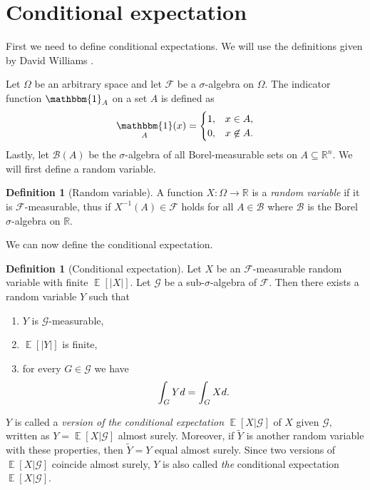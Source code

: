 \documentclass[twoside,a4paper]{report}
\theoremstyle{plain}
\theoremstyle{definition}
\newtheorem{definition}[theorem]{Definition}
\theoremstyle{remark}
\numberwithin{equation}{chapter}
\newcommand{\R}{\mathbb{R}}
\let\P\relax
\DeclareMathOperator{\P}{\mathbb{P}}
\DeclareMathOperator{\E}{\mathbb{E}}
\DeclareMathOperator{\1}{\mathbbm{1}}
\newcommand{\F}{\mathcal{F}}
\renewcommand{\G}{\mathcal{G}}
\newcommand{\B}{\mathcal{B}}
\begin{document}
\section{Conditional expectation}
First we need to define conditional expectations. We will use the definitions given by David Williams \cite{Williams91}.

Let $\Omega$ be an arbitrary space and let $\mathcal{F}$ be a $\sigma$-algebra on $\Omega$. The indicator function $\1_A$ on a set $A$ is defined as
\begin{equation}
\1_A(x)=\begin{cases}1,&x\in A,\\0,&x\not\in A.\end{cases}
\end{equation}
Lastly, let $\B(A)$ be the $\sigma$-algebra of all Borel-measurable sets on $A\subseteq\R^n$. We will first define a random variable.

\begin{definition}[Random variable]
A function $X\colon\Omega\to\R$ is a \emph{random variable} if it is $\F$-measurable, thus if $X^{-1}(A)\in\F$ holds for all $A\in\B$ where $\B$ is the Borel $\sigma$-algebra on $\R$.
\end{definition}

We can now define the conditional expectation.

\begin{definition}[Conditional expectation]\label{def:conexp}
Let $X$ be an $\F$-measurable random variable with finite $\E[|X|]$. Let $\G$ be a sub-$\sigma$-algebra of $\F$. Then there exists a random variable $Y$ such that 
\begin{enumerate}
\item $Y$ is $\G$-measurable,
\item $\E[|Y|]$ is finite,
\item for every $G\in\G$ we have 
\begin{equation}
\int_G Yd\P=\int_G Xd\P.
\end{equation}
\end{enumerate}
$Y$ is called a \emph{version of the conditional expectation} $\E[X|\G]$ of $X$ given $\G$, written as $Y=\E[X|\G]$ almost surely. Moreover, if $\tilde{Y}$ is another random variable with these properties, then $\tilde{Y}=Y$ equal almost surely. Since two versions of $\E[X|\G]$ coincide almost surely, $Y$ is also called \emph{the} conditional expectation $\E[X|\G]$.
\end{definition}
\end{document}
